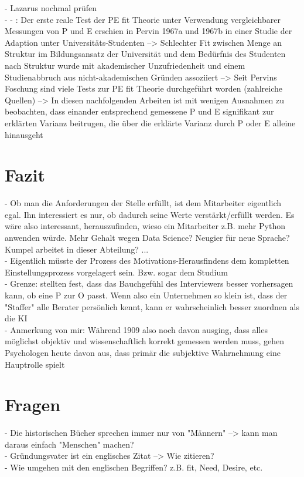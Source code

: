 - Lazarus nochmal prüfen \\
- - \cite[S. 8]{caplan:1987}: Der erste reale Test der PE fit Theorie unter Verwendung vergleichbarer Messungen von P und E erschien in Pervin 1967a und 1967b in einer Studie der Adaption unter Universitäts-Studenten --> Schlechter Fit zwischen Menge an Struktur im Bildungsansatz der Universität und dem Bedürfnis des Studenten nach Struktur wurde mit akademischer Unzufriedenheit und einem Studienabbruch aus nicht-akademischen Gründen assoziiert --> Seit Pervins Foschung sind viele Tests zur PE fit Theorie durchgeführt worden (zahlreiche Quellen) --> In diesen nachfolgenden Arbeiten ist mit wenigen Ausnahmen zu beobachten, dass einander entsprechend gemessene P und E signifikant zur erklärten Varianz beitrugen, die über die erklärte Varianz durch P oder E alleine hinausgeht\\

\section{Fazit}
\label{ch:fazit}
- Ob man die Anforderungen der Stelle erfüllt, ist dem Mitarbeiter eigentlich egal. Ihn interessiert es nur, ob dadurch seine Werte verstärkt/erfüllt werden. Es wäre also interessant, herauszufinden, wieso ein Mitarbeiter z.B. mehr Python anwenden würde. Mehr Gehalt wegen Data Science? Neugier für neue Sprache? Kumpel arbeitet in dieser Abteilung? ... \\
- Eigentlich müsste der Prozess des Motivations-Herausfindens dem kompletten Einstellungsprozess vorgelagert sein. Bzw. sogar dem Studium \\
- Grenze: \textcite{cable:1997} stellten fest, dass das Bauchgefühl des Interviewers besser vorhersagen kann, ob eine P zur O passt. Wenn also ein Unternehmen so klein ist, dass der "Staffer" alle Berater persönlich kennt, kann er wahrscheinlich besser zuordnen als die KI \\
- Anmerkung von mir: Während \textcite{parsons:1909} 1909 also noch davon ausging, dass alles möglichst objektiv und wissenschaftlich korrekt gemessen werden muss, gehen Psychologen heute davon aus, dass primär die subjektive Wahrnehmung eine Hauptrolle spielt \\

\section{Fragen}
\label{ch:fragen}
- Die historischen Bücher sprechen immer nur von "Männern" --> kann man daraus einfach "Menschen" machen?\\
- Gründungsvater ist ein englisches Zitat --> Wie zitieren?\\
- Wie umgehen mit den englischen Begriffen? z.B. fit, Need, Desire, etc.

